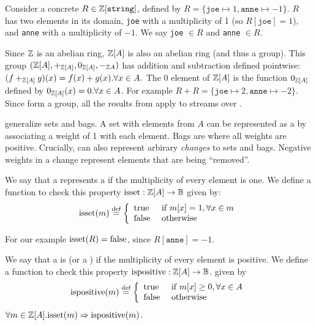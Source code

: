 \ifzsetexamples
Consider a concrete \zr $R \in \mathbb{Z}[\texttt{string}]$,
defined by $R = \{ \texttt{joe} \mapsto 1, \texttt{anne} \mapsto -1 \}$.  
$R$ has two elements in its domain,
\texttt{joe} with a multiplicity of 1 (so $R[\texttt{joe}] = 1$), 
and \texttt{anne} with a multiplicity of $-1$.
We say \texttt{joe} $\in R$ and \texttt{anne} $\in R$.
\fi

Since $\mathbb{Z}$ is an abelian ring, $\mathbb{Z}[A]$ is also an abelian ring (and thus a group).  This group
$(\mathbb{Z}[A], +_{\mathbb{Z}[A]}, 0_{\mathbb{Z}[A]}, -_{\mathbb{Z}{A}})$ has addition and subtraction defined pointwise: 
$(f +_{\mathbb{Z}[A]} g)(x) = f(x) + g(x) . \forall x \in A.$  
The $0$ element of $\mathbb{Z}[A]$ is the function $0_{\mathbb{Z}[A]}$ defined by $0_{\mathbb{Z}[A]}(x) = 0 . 
\forall x \in A$.  For example $R + R =  \{ \texttt{joe} \mapsto 2, \texttt{anne} \mapsto -2 \}$.
Since \zrs form a group, all the results from  apply to streams over \zrs. 

\zrs generalize sets and bags.  A set with elements from $A$
can be represented as a \zr by associating a weight of 1 with each element.
Bags are \zrs where all weights are positive.  Crucially, \zrs
can also represent arbirary \emph{changes} to sets and bags.
Negative weights in a change represent elements that are being ``removed''.

\begin{definition}
We say that a \zr represents a  if the multiplicity of every
element is one.  We define a function to check this property 
$\mbox{isset} : \mathbb{Z}[A] \rightarrow \mathbb{B}$
given by:
$$\mbox{isset}(m) \stackrel{\textrm{\scriptsize def}}{=} \left\{
\begin{array}{ll}
  \mbox{true} & \mbox{ if } m[x] = 1, \forall x \in m \\
  \mbox{false} & \mbox{ otherwise}
\end{array}
\right.
$$
\end{definition}

\ifzsetexamples
For our example $\mbox{isset}(R) = \mbox{false}$, since $R[\texttt{anne}] = -1$.  
\fi

\begin{definition}
We say that a \zr is  (or a ) if the multiplicity of every element is
positive.  We define a function to check this property
$\mbox{ispositive} : \mathbb{Z}[A] \rightarrow \mathbb{B}$.
given by
$$\mbox{ispositive}(m) \stackrel{\textrm{\scriptsize def}}{=} \left\{
\begin{array}{ll}
  \mbox{true} & \mbox{ if } m[x] \geq 0, \forall x \in A \\
  \mbox{false} & \mbox{ otherwise}
\end{array}
\right.$$
$\forall m \in \mathbb{Z}[A] . \mbox{isset}(m) \Rightarrow \mbox{ispositive}(m)$.
\end{definition}


